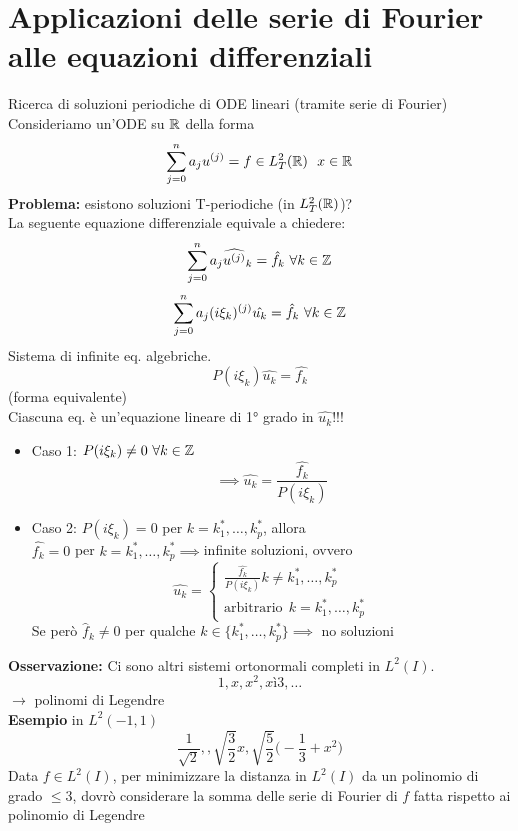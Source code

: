 \section{Applicazioni delle serie di Fourier alle equazioni differenziali}
Ricerca di soluzioni periodiche di ODE lineari (tramite serie di Fourier)
\\Consideriamo un'ODE su $\mathbb{R}$ della forma
\[\sum_{j=0}^{n} a_ju^{(j)}=f\in L^{2}_T(\R)\ \ x\in \R\]
\textbf{Problema:} esistono soluzioni T-periodiche (in $L^{2}_T(\mathbb{R})$)?
\\La seguente equazione differenziale equivale a chiedere:
\[\sum_{j=0}^{n} a_j\widehat{u^{(j)}}_k=\hat{f}_k\ \forall k\in \Z\]
\[\sum_{j=0}^{n} a_j(i\xi_k)^{(j)}\hat{u_k}=\hat{f}_k\ \forall k\in \mathbb{Z}\]
Sistema di infinite eq. algebriche.
\[P(i\xi_k)\hat{u_k}=\hat{f_k}\]
(forma equivalente)
\\Ciascuna eq. è un'equazione lineare di 1° grado in $\hat{u_k}$!!!
\begin{itemize}
	\item Caso 1: $P(i\xi_k)\neq 0\ \forall k\in \mathbb{Z}$ 
		\[\implies \hat{u_k}=\frac{\hat{f_k}}{P(i\xi_k)}\]
	\item Caso 2: $P(i\xi_k)=0$ per $k=k_1^*,\ldots,k_p^*$, allora
		\\$\hat{f_k}=0$ per $k=k_1^*,\ldots,k_p^*\implies $infinite soluzioni, ovvero
		\[\hat{u_k}=\begin{cases}
		\frac{\hat{f_k}}{P(i\xi_k)} k\neq k_1^*,\ldots,k_p^*
	\\\text{arbitrario}\ \ k=k_1^*,\ldots,k_p^*

\end{cases}\]
Se però $\hat{f}_k\neq 0$ per qualche $k\in \{k_1^*,\ldots,k^*_p\} \implies $ no soluzioni
\end{itemize}
\textbf{Osservazione:} Ci sono altri sistemi ortonormali completi in $L^{2}(I)$.
\[1,x,x^2,xì3,\ldots\]
$\to $ polinomi di Legendre\\
\textbf{Esempio} in $L^2(-1,1)$ 
\[\frac{1}{\sqrt{2} },, \sqrt{\frac{3}{2}} x, \sqrt{\frac{5}{2}} \bigg(-\frac{1}{3}+x^2\bigg)\]
Data $f\in L^{2}(I)$, per minimizzare la distanza in $L^{2}(I)$ da un polinomio di grado $\le 3$, dovrò considerare la somma delle serie di Fourier di  $f$ fatta rispetto ai polinomio di Legendre
